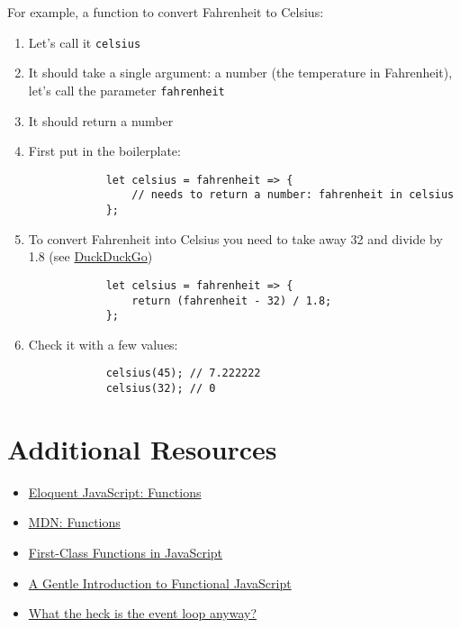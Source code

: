 For example, a function to convert Fahrenheit to Celsius:

\begin{enumerate}
    \item Let's call it \texttt{celsius}
    \item It should take a single argument: a number (the temperature in Fahrenheit), let's call the parameter \texttt{fahrenheit}
    \item It should return a number
    \item First put in the boilerplate:
        \begin{verbatim}
            let celsius = fahrenheit => {
                // needs to return a number: fahrenheit in celsius
            };
        \end{verbatim}
    \item To convert Fahrenheit into Celsius you need to take away 32 and divide by 1.8 (see \href{https://duckduckgo.com}{DuckDuckGo})
        \begin{verbatim}
            let celsius = fahrenheit => {
                return (fahrenheit - 32) / 1.8;
            };
        \end{verbatim}
    \item Check it with a few values:
        \begin{verbatim}
            celsius(45); // 7.222222
            celsius(32); // 0
        \end{verbatim}
\end{enumerate}


\section{Additional Resources}

\begin{itemize}[leftmargin=*]
    \item \href{https://eloquentjavascript.net/03_functions.html}{Eloquent JavaScript: Functions}
    \item \href{https://developer.mozilla.org/en-US/docs/Web/JavaScript/Reference/Functions}{MDN: Functions}
    \item \href{https://nick.scialli.me/first-class-functions-in-javascript/}{First-Class Functions in JavaScript}
    \item \href{https://jrsinclair.com/articles/2016/gentle-introduction-to-functional-javascript-intro/}{A Gentle Introduction to Functional JavaScript}
    \item \href{https://www.youtube.com/watch?v=8aGhZQkoFbQ}{What the heck is the event loop anyway?}
\end{itemize}
